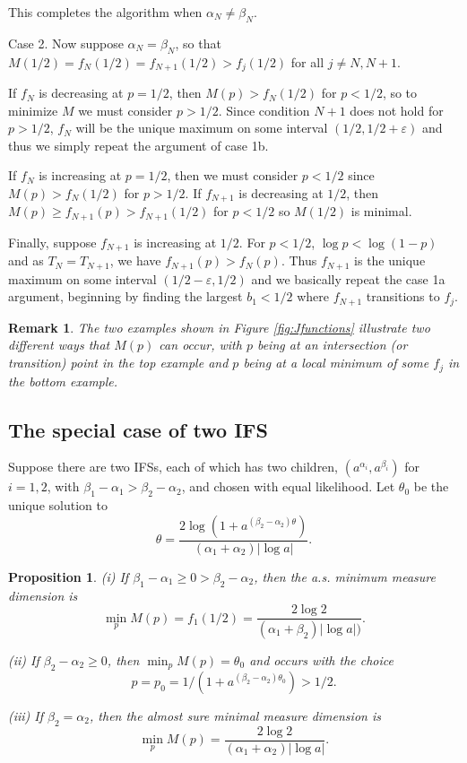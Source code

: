 \documentclass{amsart}
\newtheorem{proposition}[theorem]{Proposition}
\theoremstyle{plain}
\newtheorem{remark}{Remark}
\numberwithin{equation}{section}
\begin{document}
This completes the algorithm when $\alpha _{N}\neq \beta _{N}$.

Case 2. Now suppose $\alpha _{N}=\beta _{N}$, so that $M(1/2)=f_{N}(1/2)=f_{N+1}(1/2)>f_{j}(1/2)$ for all $j\neq N,N+1$.

If $f_{N}$ is decreasing at $p=1/2$, then $M(p)>f_{N}(1/2)$ for $p<1/2$, so
to minimize $M$ we must consider $p>1/2$. Since condition $N+1$ does not
hold for $p>1/2$, $f_{N}$ will be the unique maximum on some interval $(1/2,1/2+\varepsilon )$ 
and thus we simply repeat the argument of case 1b.

If $f_{N}$ is increasing at $p=1/2$, then we must consider $p<1/2$ since $%
M(p)>f_{N}(1/2)$ for $p>1/2$. If $f_{N+1}$ is decreasing at $1/2$, then $%
M(p)\geq f_{N+1}(p)>f_{N+1}(1/2)$ for $p<1/2$ so $M(1/2)$ is minimal.

Finally, suppose $f_{N+1}$ is increasing at $1/2$. 
For $p<1/2$, $\log p < \log (1-p)$ and as $T_{N}=T_{N+1}$, we have $f_{N+1}(p)>f_{N}(p)$. 
Thus  $f_{N+1}$ is the unique maximum on some interval $(1/2-\varepsilon ,1/2) $
and we basically repeat the case 1a argument, beginning by finding the
largest $b_{1}<1/2$ where $f_{N+1}$ transitions to $f_{j}$.

\begin{remark}
The two examples shown in Figure \ref{fig:Jfunctions} illustrate two different ways that $M(p)$ can occur,
with $p$ being at an intersection (or transition) point in the top example and $p$ being at a local minimum
of some $f_j$ in the bottom example.


\end{remark}

\subsection{The special case of two IFS}

Suppose there are two IFSs, each of which has two children, $(a^{\alpha
_{i}},a^{\beta _{i}})$ for $i=1,2$, with $\beta _{1}-\alpha _{1}>\beta
_{2}-\alpha _{2}$, and chosen with equal likelihood. Let $\theta _{0}$ be
the unique solution to 
\begin{equation*}
\theta =\frac{2\log (1+a^{(\beta _{2}-\alpha _{2})\theta })}{(\alpha
_{1}+\alpha _{2})\left\vert \log a\right\vert }.
\end{equation*}

\begin{proposition}
(i) If $\beta _{1}-\alpha _{1}\geq 0>\beta _{2}-\alpha _{2}$, then the a.s. minimum 
measure dimension is
\begin{equation*}
    \min_{p}M(p)=f_{1}(1/2)=\frac{2\log 2}{(\alpha _{1}+\beta _{2})|\log a|)}.
\end{equation*}

(ii) If $\beta _{2}-\alpha _{2}\geq 0$, then $\min_{p}M(p)=\theta _{0}$ and
occurs with the choice 
\[
   p=p_{0}=1/(1+a^{(\beta _{2}-\alpha_{2})\theta _{0}}) > 1/2.
\]

(iii) If $\beta _{2}=\alpha _{2}$, then the almost sure minimal measure
dimension is 
\[  
   \min_p M(p) = \frac{2\log 2}{(\alpha _{1}+\alpha _{2})|\log a|}.
\]

\end{proposition}
\end{document}
